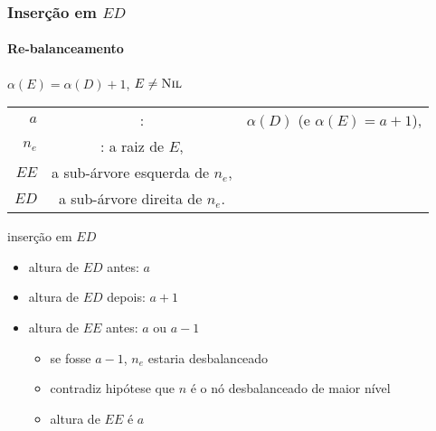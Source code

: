 \documentclass{beamer}
\begin{document}
\begin{frame}

\frametitle{Inserção em $ED$}
\framesubtitle{Re-balanceamento}

$\alpha(E) = \alpha(D)+1$, $E \neq \textnormal{\scshape Nil}$

\begin{tabular}{rcl}
$a$ & : & $\alpha(D)$ (e $\alpha(E) = a+1$), \\
$n_e$ & : a raiz de $E$, \\
$EE$ & a sub-árvore esquerda de $n_e$, \\ 
$ED$ & a sub-árvore direita de $n_e$.
\end{tabular}

inserção em $ED$

\begin{itemize}

\item altura de $ED$ antes: $a$

\item altura de $ED$ depois: $a+1$

\item altura de $EE$ antes: $a$ ou $a-1$

\begin{itemize}

\item se fosse $a-1$, $n_e$ estaria desbalanceado

\item contradiz hipótese que $n$ é o nó desbalanceado de maior nível

\item altura de $EE$ é $a$

\end{itemize}

\end{itemize}

\end{frame}
\end{document}
